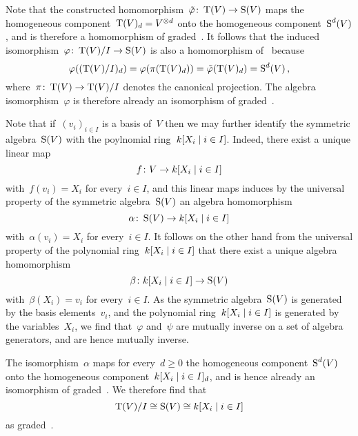 Note that the constructed homomorphism~$\tilde{\varphi} \colon \operatorname{T}(V) \to \operatorname{S}(V)$ maps the homogeneous component~$\operatorname{T}(V)_d = V^{\otimes d}$ onto the homogeneous component~$\operatorname{S}^d(V)$, and is therefore a homomorphism of graded~{\kalgs}.
It follows that the induced isomorphism~$\varphi \colon \operatorname{T}(V)/I \to \operatorname{S}(V)$ is also a homomorphism of~{\kalgs} because
\[
    \varphi( (\operatorname{T}(V)/I)_d )
  = \varphi( \pi(\operatorname{T}(V)_d) )
  = \tilde{\varphi}( \operatorname{T}(V)_d )
  = \operatorname{S}^d(V) \,,
\]
where~$\pi \colon \operatorname{T}(V) \to \operatorname{T}(V)/I$ denotes the canonical projection.
The algebra isomorphism~$\varphi$ is therefore already an isomorphism of graded~{\kalgs}.

Note that if~$(v_i)_{i \in I}$ is a basis of~$V$ then we may further identify the symmetric algebra~$\operatorname{S}(V)$ with the poylnomial ring~$k[X_i \suchthat i \in I]$.
Indeed, there exist a unique linear map
\[
          f
  \colon  V
  \to     k[X_i \suchthat i \in I]
\]
with~$f(v_i) = X_i$ for every~$i \in I$, and this linear maps induces by the universal property of the symmetric algebra~$\operatorname{S}(V)$ an algebra homomorphism
\[
          \alpha
  \colon  \Symm(V)
  \to     k[X_i \suchthat i \in I]
\]
with~$\alpha(v_i) = X_i$ for every~$i \in I$.
It follows on the other hand from the universal property of the polynomial ring~$k[X_i \suchthat i \in I]$ that there exist a unique algebra homomorphism
\[
          \beta
  \colon  k[X_i \suchthat i \in I]
  \to     \Symm(V)
\]
with~$\beta(X_i) = v_i$ for every~$i \in I$.
As the symmetric algebra~$\operatorname{S}(V)$ is generated by the basis elements~$v_i$, and the polynomial ring~$k[X_i \suchthat i \in I]$ is generated by the variables~$X_i$, we find that~$\varphi$ and~$\psi$ are mutually inverse on a set of algebra generators, and are hence mutually inverse.

The isomorphism~$\alpha$ maps for every~$d \geq 0$ the homogeneous component~$\operatorname{S}^d(V)$ onto the homogeneous component~$k[X_i \suchthat i \in I]_d$, and is hence already an isomorphism of graded~{\kalgs}.
We therefore find that
\[
        \Tensor(V)/I
  \cong \Symm(V)
  \cong k[X_i \suchthat i \in I]
\]
as graded~{\kalgs}.











\subsection{}

